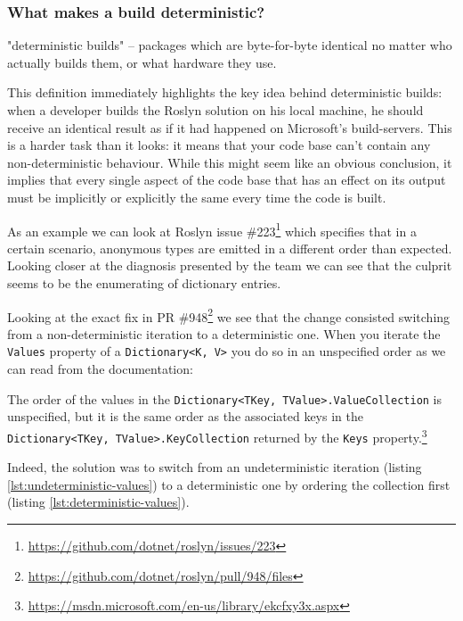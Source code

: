 \subsubsection{What makes a build deterministic?}
\label{sec:deterministic-builds-what}

\begin{displayquote}
"deterministic builds" -- packages which are byte-for-byte identical no matter who actually builds them, or what hardware they use.\parencite{Perry2013} 
\end{displayquote}

\noindent This definition immediately highlights the key idea behind deterministic builds: when a developer builds the Roslyn solution on his local machine, he should receive an identical result as if it had happened on Microsoft's build-servers. This is a harder task than it looks: it means that your code base can't contain any non-deterministic behaviour. While this might seem like an obvious conclusion, it implies that every single aspect of the code base that has an effect on its output must be implicitly or explicitly the same every time the code is built. 

As an example we can look at Roslyn issue \#223\footnote{\url{https://github.com/dotnet/roslyn/issues/223}} which specifies that in a certain scenario, anonymous types are emitted in a different order than expected. Looking closer at the diagnosis presented by the team we can see that the culprit seems to be the enumerating of dictionary entries.

Looking at the exact fix in PR \#948\footnote{\url{https://github.com/dotnet/roslyn/pull/948/files}} we see that the change consisted switching from a non-deterministic iteration to a deterministic one. When you iterate the \texttt{Values} property of a \texttt{Dictionary<K, V>} you do so in an unspecified order as we can read from the documentation:

\begin{displayquote}
The order of the values in the \texttt{Dictionary<TKey, TValue>.ValueCollection} is unspecified, but it is the same order as the associated keys in the \texttt{Dictionary<TKey, TValue>.KeyCollection} returned by the \texttt{Keys} property.\footnote{\url{https://msdn.microsoft.com/en-us/library/ekcfxy3x.aspx}}
\end{displayquote}

\noindent Indeed, the solution was to switch from an undeterministic iteration (listing \ref{lst:undeterministic-values}) to a deterministic one by ordering the collection first (listing \ref{lst:deterministic-values}).

